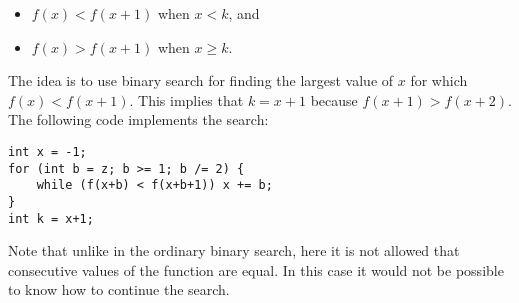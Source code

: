 \begin{itemize}
\item
$f(x)<f(x+1)$ when $x<k$, and
\item
$f(x)>f(x+1)$ when $x \ge k$.
\end{itemize}

The idea is to use binary search
for finding the largest value of $x$
for which $f(x)<f(x+1)$.
This implies that $k=x+1$
because $f(x+1)>f(x+2)$.
The following code implements the search: 

\begin{lstlisting}
int x = -1;
for (int b = z; b >= 1; b /= 2) {
    while (f(x+b) < f(x+b+1)) x += b;
}
int k = x+1;
\end{lstlisting}

Note that unlike in the ordinary binary search,
here it is not allowed that consecutive values
of the function are equal.
In this case it would not be possible to know
how to continue the search.
